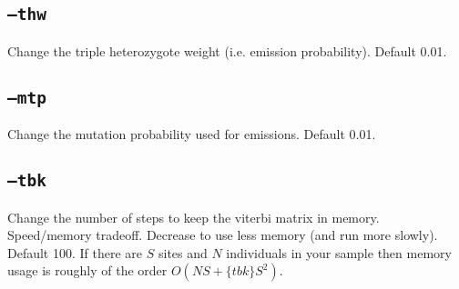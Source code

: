 \documentclass[10pt]{refart}
\begin{document}
\subsection{\texttt{--thw}}
Change the triple heterozygote weight (i.e. emission probability). Default 0.01.

\subsection{\texttt{--mtp}}
Change the mutation probability used for emissions. Default 0.01.

\subsection{\texttt{--tbk}}
Change the number of steps to keep the viterbi matrix in
memory. Speed/memory tradeoff. Decrease to use less memory (and run
more slowly). Default 100. If there are $S$ sites and $N$ individuals
in your sample then memory usage is roughly of the order
$O(NS+\{tbk\}S^2)$. 
\end{document}
